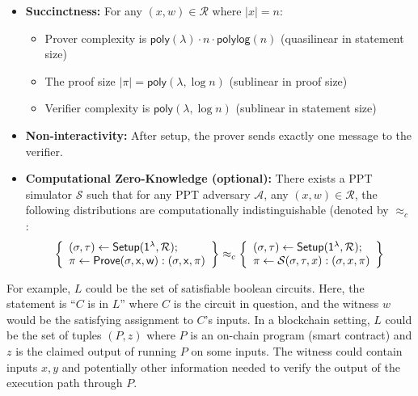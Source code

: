\begin{definition}
\begin{itemize}
    \item \textbf{Succinctness:} For any $(x, w) \in \mathcal{R}$ where $|x| = n$:
    \begin{itemize}
     \item Prover complexity is $\mathsf{poly}(\lambda) \cdot n \cdot \mathsf{polylog}(n)$ (quasilinear in statement size)
        \item The proof size $|\pi| = \mathsf{poly}(\lambda, \log n)$ (sublinear in proof size) 
        \item Verifier complexity is $\mathsf{poly}(\lambda, \log n)$ (sublinear in statement size)
    \end{itemize}
    
    \item \textbf{Non-interactivity:} After setup, the prover sends exactly one message to the verifier.
    \item \textbf{Computational Zero-Knowledge (optional):} There exists a PPT simulator $\mathcal{S}$ such that for any PPT adversary $\mathcal{A}$, any $(x, w) \in \mathcal{R}$, the following distributions are computationally indistinguishable (denoted by $\approx_c$:
    \begin{align*}
    \left\{ \begin{array}{l}
    (\sigma, \tau) \leftarrow \sf{Setup}(1^{\lambda}, \mathcal{R}); \\
    \pi \leftarrow \sf{Prove}(\sigma, x, w) : (\sigma, x, \pi)
    \end{array} \right\} \approx_c
    \left\{ \begin{array}{l}
    (\sigma, \tau) \leftarrow \sf{Setup}(1^{\lambda}, \mathcal{R}); \\
    \pi \leftarrow \mathcal{S}(\sigma, \tau, x) : (\sigma, x, \pi)
    \end{array} \right\}
\end{align*}
\end{itemize}
\end{definition}

\noindent For example, $L$ could be the set of satisfiable boolean circuits. Here, the statement is ``$C$ is in $L$'' where $C$ is the circuit in question, and the witness $w$ would be the satisfying assignment to $C$'s inputs. In a blockchain setting, $L$ could be the set of tuples $(P, z)$ where $P$ is an on-chain program (smart contract) and $z$ is the claimed output of running $P$ on some inputs. The witness could contain inputs $x, y$ and potentially other information needed to verify the output of the execution path through $P$.\\

